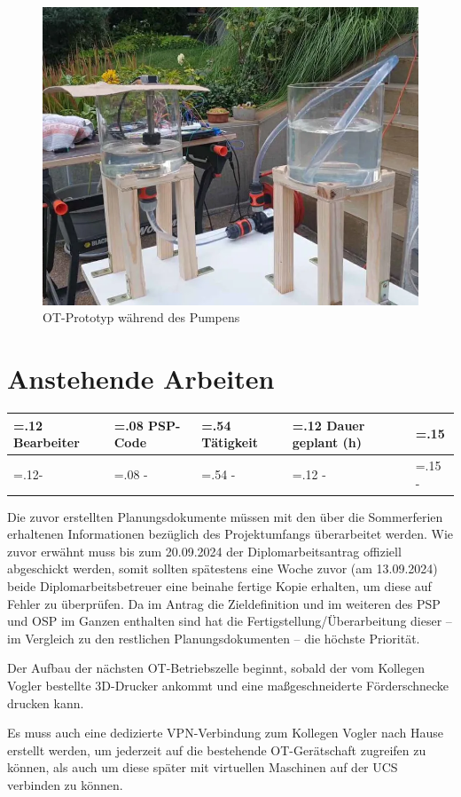 \documentclass[
	headings=optiontotocandhead,%
	oneside,
	numbers=noenddot,%
	toc=flat, %
	10pt, %
	parskip=full, %
	listof=totoc, %
	listof=flat, %
	numbers=noenddot, %
	bibliography=totoc, %
	a4paper,DIV=14,
]{scrartcl}
\begin{document}
\begin{figure}[h]
	\centering
	\includegraphics[width=0.6\linewidth]{20240910_3}
	\caption[]{OT-Prototyp während des Pumpens}
\end{figure}
\FloatBarrier 

\section{Anstehende Arbeiten}
\begin{table}[h]
	\begin{tabularx} {\textwidth} {
			|>{\hsize=.12\hsize}X
			|>{\hsize=.08\hsize}X
			|>{\hsize=.54\hsize}X
			|>{\hsize=.12\hsize}X
			|>{\hsize=.15\hsize}X|
		}
		
		\hline
		\rowcolor[HTML]{D9D9D9} 
		\textbf{\normalsize{Bearbeiter}} & \textbf{\normalsize{PSP-Code}} & {\textbf{\normalsize{Tätigkeit}}} & \textbf{\normalsize{Dauer geplant (h)}} & \textbf{\smaller{Fertigstellung geplant}} \\ \hline
		- & - & - & - & - \\ \hline
	\end{tabularx}
\end{table}

Die zuvor erstellten Planungsdokumente müssen mit den über die Sommerferien erhaltenen Informationen bezüglich des Projektumfangs überarbeitet werden. Wie zuvor erwähnt muss bis zum 20.09.2024 der Diplomarbeitsantrag offiziell abgeschickt werden, somit sollten spätestens eine Woche zuvor (am 13.09.2024) beide Diplomarbeitsbetreuer eine beinahe fertige Kopie erhalten, um diese auf Fehler zu überprüfen. Da im Antrag die Zieldefinition und im weiteren des PSP und OSP im Ganzen enthalten sind hat die Fertigstellung/Überarbeitung dieser -- im Vergleich zu den restlichen Planungsdokumenten -- die höchste Priorität.

Der Aufbau der nächsten OT-Betriebszelle beginnt, sobald der vom Kollegen Vogler bestellte 3D-Drucker ankommt und eine maßgeschneiderte Förderschnecke drucken kann.

Es muss auch eine dedizierte VPN-Verbindung zum Kollegen Vogler nach Hause erstellt werden, um jederzeit auf die bestehende OT-Gerätschaft zugreifen zu können, als auch um diese später mit virtuellen Maschinen auf der UCS verbinden zu können.
\end{document}
